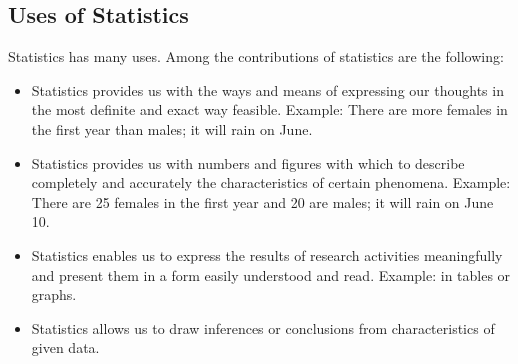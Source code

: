 \subsection*{Uses of Statistics}
Statistics has many uses. Among the contributions of statistics are the following:
\begin{itemize}
\item Statistics provides us with the ways and means of expressing our thoughts in the most
definite and exact way feasible. Example: There are more females in the first year than
males; it will rain on June.
\item Statistics provides us with numbers and figures with which to describe completely and
   accurately the characteristics of certain phenomena. Example: There are 25 females in
  the first year and 20 are males; it will rain on June 10.
\item Statistics enables us to express the results of research activities meaningfully and
   present them in a form easily understood and read. Example: in tables or graphs.
\item Statistics allows us to draw inferences or conclusions from characteristics of given data.
\end{itemize}
